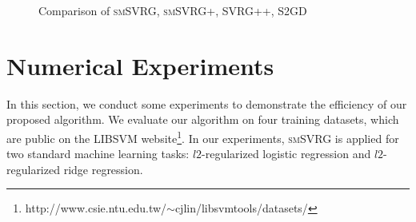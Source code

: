 \documentclass[conference]{IEEEtran}
\begin{document}
 \begin{figure}[htb]
\centering
{}
\label{cmijcnn1}
\caption{Comparison of \textsc{smSVRG}, \textsc{smSVRG+}, SVRG++, S2GD}
\end{figure}
 
 \section{Numerical Experiments}
 \label{numexperiments}
 In this section, we conduct some experiments to demonstrate the efficiency of our proposed algorithm. We evaluate our algorithm on four training datasets, which are public on the LIBSVM website\footnote{http://www.csie.ntu.edu.tw/$\sim$cjlin/libsvmtools/datasets/}. In our experiments, \textsc{smSVRG} is applied for two standard machine learning tasks: $l2$-regularized logistic regression and $l2$-regularized ridge regression.
 
\end{document}
